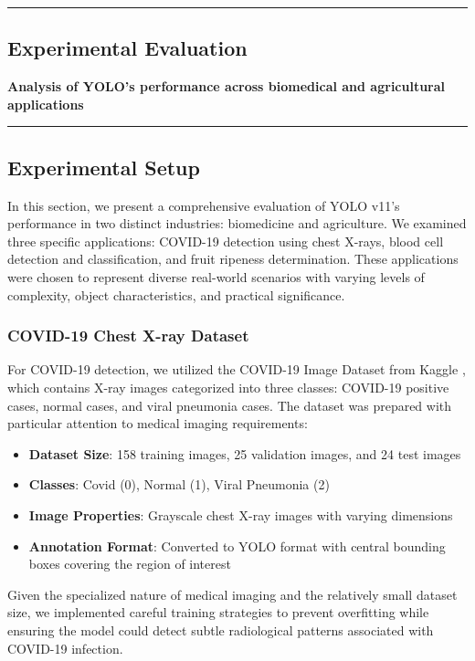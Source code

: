 {\color{gray}\hrule}
\begin{center}
\section{Experimental Evaluation}
\textbf{Analysis of YOLO's performance across biomedical and agricultural applications}
\bigskip
\end{center}
{\color{gray}\hrule}
\begin{multicols}{2}
\subsection{Experimental Setup}

In this section, we present a comprehensive evaluation of YOLO v11's performance in two distinct industries: biomedicine and agriculture. We examined three specific applications: COVID-19 detection using chest X-rays, blood cell detection and classification, and fruit ripeness determination. These applications were chosen to represent diverse real-world scenarios with varying levels of complexity, object characteristics, and practical significance.

\subsubsection{COVID-19 Chest X-ray Dataset}

For COVID-19 detection, we utilized the COVID-19 Image Dataset from Kaggle \citep{Raikokte2020}, which contains X-ray images categorized into three classes: COVID-19 positive cases, normal cases, and viral pneumonia cases. The dataset was prepared with particular attention to medical imaging requirements:
\begin{itemize}
    \item \textbf{Dataset Size}: 158 training images, 25 validation images, and 24 test images
    \item \textbf{Classes}: Covid (0), Normal (1), Viral Pneumonia (2)
    \item \textbf{Image Properties}: Grayscale chest X-ray images with varying dimensions
    \item \textbf{Annotation Format}: Converted to YOLO format with central bounding boxes covering the region of interest
\end{itemize}
Given the specialized nature of medical imaging and the relatively small dataset size, we implemented careful training strategies to prevent overfitting while ensuring the model could detect subtle radiological patterns associated with COVID-19 infection.


\end{multicols}
